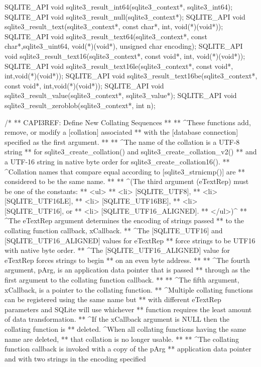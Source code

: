 \begin{Codex}[label=sqlite3.h,numbers=left]
{SQLITE_API void sqlite3_result_int64(sqlite3_context*, sqlite3_int64);
SQLITE_API void sqlite3_result_null(sqlite3_context*);
SQLITE_API void sqlite3_result_text(sqlite3_context*, const char*, int, void(*)(void*));
SQLITE_API void sqlite3_result_text64(sqlite3_context*, const char*,sqlite3_uint64,
                           void(*)(void*), unsigned char encoding);
SQLITE_API void sqlite3_result_text16(sqlite3_context*, const void*, int, void(*)(void*));
SQLITE_API void sqlite3_result_text16le(sqlite3_context*, const void*, int,void(*)(void*));
SQLITE_API void sqlite3_result_text16be(sqlite3_context*, const void*, int,void(*)(void*));
SQLITE_API void sqlite3_result_value(sqlite3_context*, sqlite3_value*);
SQLITE_API void sqlite3_result_zeroblob(sqlite3_context*, int n);

/*
** CAPI3REF: Define New Collating Sequences
**
** ^These functions add, remove, or modify a [collation] associated
** with the [database connection] specified as the first argument.
**
** ^The name of the collation is a UTF-8 string
** for sqlite3_create_collation() and sqlite3_create_collation_v2()
** and a UTF-16 string in native byte order for sqlite3_create_collation16().
** ^Collation names that compare equal according to [sqlite3_strnicmp()] are
** considered to be the same name.
**
** ^(The third argument (eTextRep) must be one of the constants:
** <ul>
** <li> [SQLITE_UTF8],
** <li> [SQLITE_UTF16LE],
** <li> [SQLITE_UTF16BE],
** <li> [SQLITE_UTF16], or
** <li> [SQLITE_UTF16_ALIGNED].
** </ul>)^
** ^The eTextRep argument determines the encoding of strings passed
** to the collating function callback, xCallback.
** ^The [SQLITE_UTF16] and [SQLITE_UTF16_ALIGNED] values for eTextRep
** force strings to be UTF16 with native byte order.
** ^The [SQLITE_UTF16_ALIGNED] value for eTextRep forces strings to begin
** on an even byte address.
**
** ^The fourth argument, pArg, is an application data pointer that is passed
** through as the first argument to the collating function callback.
**
** ^The fifth argument, xCallback, is a pointer to the collating function.
** ^Multiple collating functions can be registered using the same name but
** with different eTextRep parameters and SQLite will use whichever
** function requires the least amount of data transformation.
** ^If the xCallback argument is NULL then the collating function is
** deleted.  ^When all collating functions having the same name are deleted,
** that collation is no longer usable.
**
** ^The collating function callback is invoked with a copy of the pArg 
** application data pointer and with two strings in the encoding specified
}
\end{Codex}
